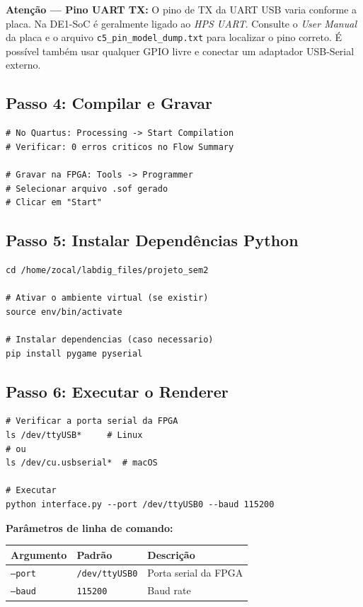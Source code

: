 \documentclass[12pt,a4paper]{article}
\begin{document}
\begin{mdframed}[linecolor=uartred, linewidth=1.5pt, innertopmargin=8pt, innerbottommargin=8pt]
\textbf{Atenção — Pino UART TX:} O pino de TX da UART USB varia conforme a placa. Na DE1-SoC é geralmente ligado ao \textit{HPS UART}. Consulte o \textit{User Manual} da placa e o arquivo \texttt{c5\_pin\_model\_dump.txt} para localizar o pino correto. É possível também usar qualquer GPIO livre e conectar um adaptador USB-Serial externo.
\end{mdframed}

\subsection{Passo 4: Compilar e Gravar}

\begin{lstlisting}[style=shell]
# No Quartus: Processing -> Start Compilation
# Verificar: 0 erros criticos no Flow Summary

# Gravar na FPGA: Tools -> Programmer
# Selecionar arquivo .sof gerado
# Clicar em "Start"
\end{lstlisting}

\subsection{Passo 5: Instalar Dependências Python}

\begin{lstlisting}[style=shell]
cd /home/zocal/labdig_files/projeto_sem2

# Ativar o ambiente virtual (se existir)
source env/bin/activate

# Instalar dependencias (caso necessario)
pip install pygame pyserial
\end{lstlisting}

\subsection{Passo 6: Executar o Renderer}

\begin{lstlisting}[style=shell]
# Verificar a porta serial da FPGA
ls /dev/ttyUSB*     # Linux
# ou
ls /dev/cu.usbserial*  # macOS

# Executar
python interface.py --port /dev/ttyUSB0 --baud 115200
\end{lstlisting}

\textbf{Parâmetros de linha de comando:}
\begin{center}
\begin{tabular}{lll}
\toprule
\textbf{Argumento} & \textbf{Padrão} & \textbf{Descrição} \\
\midrule
\texttt{--port} & \texttt{/dev/ttyUSB0} & Porta serial da FPGA \\
\texttt{--baud} & \texttt{115200}       & Baud rate \\
\bottomrule
\end{tabular}
\end{center}
\end{document}
